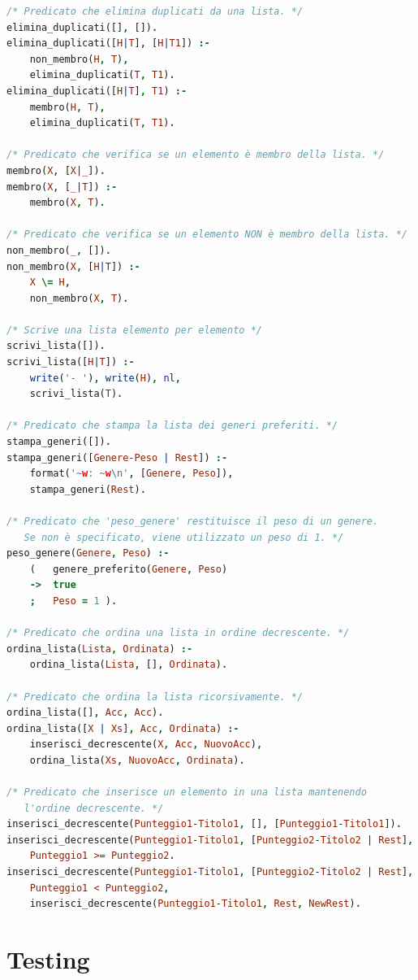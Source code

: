 \documentclass[a4paper,11pt]{article}
\begin{document}
\begin{lstlisting}[language=Prolog]
/* Predicato che elimina duplicati da una lista. */
elimina_duplicati([], []).
elimina_duplicati([H|T], [H|T1]) :-
    non_membro(H, T),
    elimina_duplicati(T, T1).
elimina_duplicati([H|T], T1) :-
    membro(H, T),
    elimina_duplicati(T, T1).

/* Predicato che verifica se un elemento è membro della lista. */
membro(X, [X|_]).
membro(X, [_|T]) :-
    membro(X, T).

/* Predicato che verifica se un elemento NON è membro della lista. */
non_membro(_, []).
non_membro(X, [H|T]) :-
    X \= H,
    non_membro(X, T).

/* Scrive una lista elemento per elemento */
scrivi_lista([]).
scrivi_lista([H|T]) :-
    write('- '), write(H), nl,
    scrivi_lista(T).

/* Predicato che stampa la lista dei generi preferiti. */
stampa_generi([]).
stampa_generi([Genere-Peso | Rest]) :-
    format('~w: ~w\n', [Genere, Peso]),
    stampa_generi(Rest).

/* Predicato che 'peso_genere' restituisce il peso di un genere.
   Se non è specificato, viene utilizzato un peso di 1. */
peso_genere(Genere, Peso) :-
    (   genere_preferito(Genere, Peso)
    ->  true
    ;   Peso = 1 ).

/* Predicato che ordina una lista in ordine decrescente. */
ordina_lista(Lista, Ordinata) :-
    ordina_lista(Lista, [], Ordinata).

/* Predicato che ordina la lista ricorsivamente. */
ordina_lista([], Acc, Acc).
ordina_lista([X | Xs], Acc, Ordinata) :-
    inserisci_decrescente(X, Acc, NuovoAcc),
    ordina_lista(Xs, NuovoAcc, Ordinata).

/* Predicato che inserisce un elemento in una lista mantenendo
   l'ordine decrescente. */
inserisci_decrescente(Punteggio1-Titolo1, [], [Punteggio1-Titolo1]).
inserisci_decrescente(Punteggio1-Titolo1, [Punteggio2-Titolo2 | Rest], [Punteggio1-Titolo1, Punteggio2-Titolo2 | Rest]) :-
    Punteggio1 >= Punteggio2.
inserisci_decrescente(Punteggio1-Titolo1, [Punteggio2-Titolo2 | Rest], [Punteggio2-Titolo2 | NewRest]) :-
    Punteggio1 < Punteggio2,
    inserisci_decrescente(Punteggio1-Titolo1, Rest, NewRest).
    \end{lstlisting}

    \newpage
    \section{Testing}
\end{document}
